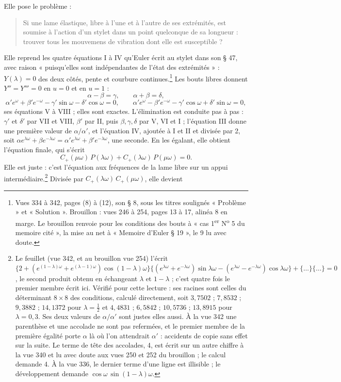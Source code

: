 \documentclass[11pt,a4paper]{article}
\begin{document}
Elle pose le problème :
\begin{quote}
Si une lame élastique, libre à l'une et à l'autre de ses extrémités, est soumise à l'action d'un stylet dans un point quelconque de sa longueur : trouver tous les mouvemens de vibration dont elle est susceptible ?
\end{quote}
Elle reprend les quatre équations I à IV qu'Euler écrit au stylet dans son § 47, avec raison « puisqu'elles sont indépendantes de l'état des extrémités » : $Y(\lambda)=0$ des deux côtés, pente et courbure continues.\footnote{Vues 334 à 342, pages (8) à (12), son § 8, sous les titres soulignés « Problème » et « Solution ». Brouillon : vues 246 à 254, pages 13 à 17, alinéa 8 en marge. Le brouillon renvoie pour les conditions des bouts à « cas 1\textsuperscript{er} N\textsuperscript{o} 5 du memoire cité », la mise au net à « Memoire d'Euler § 19 », le 9 lu avec doute.} Les bouts libres donnent $Y''=Y'''=0$ en $u=0$ et en $u=1$ :
\[
\alpha-\beta=\gamma,\qquad \alpha+\beta=\delta,
\]
\[
\alpha'e^{\omega}+\beta'e^{-\omega}-\gamma'\sin\omega-\delta'\cos\omega=0,\qquad
\alpha'e^{\omega}-\beta'e^{-\omega}-\gamma'\cos\omega+\delta'\sin\omega=0 ,
\]
ses équations V à VIII ; elles sont exactes. L'élimination est conduite pas à pas : $\gamma'$ et $\delta'$ par VII et VIII, $\beta'$ par II, puis $\beta,\gamma,\delta$ par V, VI et I ; l'équation III donne une première valeur de $\alpha/\alpha'$, et l'équation IV, ajoutée à I et II et divisée par 2, soit $\alpha e^{\lambda\omega}+\beta e^{-\lambda\omega}=\alpha'e^{\lambda\omega}+\beta'e^{-\lambda\omega}$, une seconde. En les égalant, elle obtient l'équation finale, qui s'écrit
\[
C_{+}(\mu\omega)\,P(\lambda\omega)+C_{+}(\lambda\omega)\,P(\mu\omega)=0 .
\]
Elle est juste : c'est l'équation aux fréquences de la lame libre sur un appui intermédiaire.\footnote{Le feuillet (vue 342, et au brouillon vue 254) l'écrit $\{2+(e^{(1-\lambda)\omega}+e^{(\lambda-1)\omega})\cos(1-\lambda)\omega\}\{(e^{\lambda\omega}+e^{-\lambda\omega})\sin\lambda\omega-(e^{\lambda\omega}-e^{-\lambda\omega})\cos\lambda\omega\}+\{\dots\}\{\dots\}=0$, le second produit obtenu en échangeant $\lambda$ et $1-\lambda$ ; c'est quatre fois le premier membre écrit ici. Vérifié pour cette lecture : ses racines sont celles du déterminant $8\times8$ des conditions, calculé directement, soit $3{,}7502$ ; $7{,}8532$ ; $9{,}3882$ ; $14{,}1372$ pour $\lambda=\frac12$ et $4{,}4831$ ; $6{,}5842$ ; $10{,}5736$ ; $13{,}8915$ pour $\lambda=0{,}3$. Ses deux valeurs de $\alpha/\alpha'$ sont justes elles aussi. À la vue 342 une parenthèse et une accolade ne sont pas refermées, et le premier membre de la première égalité porte $\alpha$ là où l'on attendrait $\alpha'$ : accidents de copie sans effet sur la suite. Le terme de tête des accolades, 4, est écrit sur un autre chiffre à la vue 340 et lu avec doute aux vues 250 et 252 du brouillon ; le calcul demande 4. À la vue 336, le dernier terme d'une ligne est illisible ; le développement demande $\cos\omega\,\sin(1-\lambda)\omega$.} Divisée par $C_{+}(\lambda\omega)\,C_{+}(\mu\omega)$, elle devient
\end{document}
